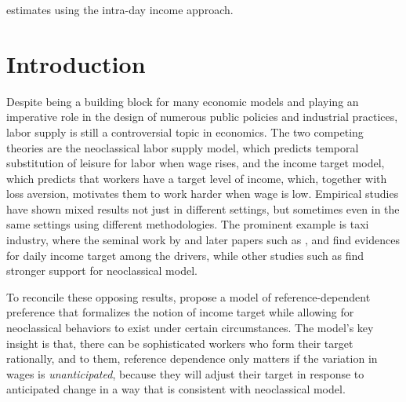 \documentclass[reviewmode]{restud}
\begin{document}
estimates using the intra-day income approach.


\section{Introduction}

Despite being a building block for many economic models and playing an imperative role in the design of numerous public policies and industrial practices, labor supply is still a controversial topic in economics. The two competing theories are the neoclassical labor supply model, which predicts temporal substitution of leisure for labor when wage rises, and the income target model, which predicts that workers have a target level of income, which, together with loss aversion, motivates them to work harder when wage is low. Empirical studies have shown mixed results not just in different settings, but sometimes even in the same settings using different methodologies. The prominent example is taxi  industry, where the seminal work by \citet{camerer1997labor} and later papers such as \citet{crawford2011new}, \citet{martin2017quit} and  \citet{thakral2018daily} find evidences for daily income target among the drivers, while other studies such as \citet{farber2005tomorrow,farber2015you} find stronger support for neoclassical model.

To reconcile these opposing results, \citet{kHoszegi2006model} propose a model of reference-dependent preference that formalizes the notion of income target while allowing for neoclassical behaviors to exist under certain circumstances.
The model's key insight is that, there can be sophisticated workers who form their target rationally, and to them, reference dependence only matters if the variation in wages is \textit{unanticipated}, because they will adjust their target in response to anticipated change in a way that is consistent with neoclassical model.
\end{document}
